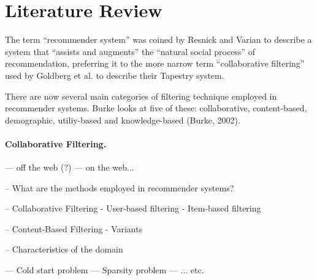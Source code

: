 \iffalse
Chapter 2: Literature Review and Context - the setting of the project in the context of other relevant work or theories or results. How this setting influenced the project.
\fi

\section{Literature Review}\label{literature review}

The term ``recommender system'' was coined by Resnick and Varian \cite{Resnick97} to describe  a system that ``assists and augments'' the ``natural social process'' of recommendation, preferring it to the more narrow term ``collaborative filtering'' used by Goldberg et al. \cite{Goldberg92}  to describe their Tapestry system. 

There are now several main categories of filtering technique employed in recommender systems. Burke \cite{Burke02} looks at five of these: collaborative, content-based, demographic, utiliy-based and knowledge-based (Burke, 2002). 

\paragraph{Collaborative Filtering.}




--- off the web (?)
--- on the web...

-- What are the methods employed in recommender systems?

-- Collaborative Filtering
  - User-based filtering
  - Item-based filtering

-- Content-Based Filtering
  - Variants

-- Characteristics of the domain

--- Cold start problem
--- Sparsity problem
--- ... etc.

